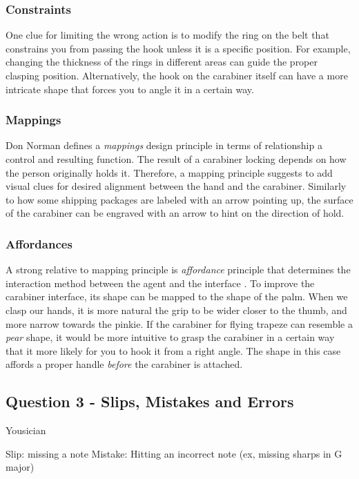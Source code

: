\documentclass[12pt,letterpaper]{article}
\begin{document}
\subsubsection*{Constraints}
One clue for limiting the wrong action is to modify the ring on the belt that constrains you from passing the hook unless it is a specific position. For example, changing the thickness of the rings in different areas can guide the proper clasping position. Alternatively, the hook on the carabiner itself can have a more intricate shape that forces you to angle it in a certain way.

\subsubsection*{Mappings}
Don Norman defines a  \textit{mappings} design principle in terms of relationship a control and resulting function\cite{norman2013design}. The result of a carabiner locking depends on how the person originally holds it. Therefore, a mapping principle suggests to add visual clues for desired alignment between the hand and the carabiner. Similarly to how some shipping packages are labeled with an arrow pointing up, the surface of the carabiner can be engraved with an arrow to hint on the direction of hold.    

\subsubsection*{Affordances}
A strong relative to mapping principle is \textit{affordance} principle that determines the interaction method between the agent and the interface \cite{norman2013design}. To improve the carabiner interface, its shape can be mapped to the shape of the palm. When we clasp our hands, it is more natural the grip to be wider closer to the thumb, and more narrow towards the pinkie. If the carabiner for flying trapeze can resemble a \textit{pear} shape, it would be more intuitive to grasp the carabiner in a certain way that it more likely for you to hook it from a right angle. The shape in this case affords a proper handle \textit{before} the carabiner is attached.


\subsection*{Question 3 - Slips, Mistakes and Errors}

Yousician 

Slip: missing a note 
Mistake: Hitting an incorrect note (ex, missing sharps in G major)
\end{document}
